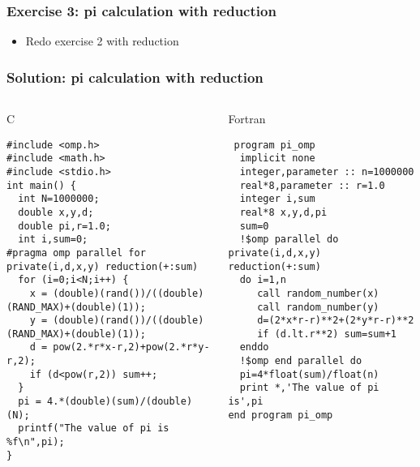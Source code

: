 \documentclass[slidestop,mathserif,compress,xcolor=svgnames]{beamer}
\newenvironment{eblock}[0]
{
\begin{beamerboxesrounded}[upper=uppercol2,lower=lowercol2,shadow=true]}
{\end{beamerboxesrounded}}
\begin{document}
\begin{frame}
  \frametitle{\small Exercise 3: pi calculation with reduction}
  \begin{itemize}
    \item Redo exercise 2 with reduction
  \end{itemize}
\end{frame}

\begin{frame}[fragile]
  \frametitle{\small Solution: pi calculation with reduction}
  {\fontsize{4}{5}
  \begin{columns}
    \column{5cm}
    \begin{eblock}{C }
      \begin{verbatim}
#include <omp.h>
#include <math.h>
#include <stdio.h>
int main() {
  int N=1000000;
  double x,y,d;
  double pi,r=1.0;
  int i,sum=0;
#pragma omp parallel for private(i,d,x,y) reduction(+:sum)
  for (i=0;i<N;i++) {
    x = (double)(rand())/((double)(RAND_MAX)+(double)(1));
    y = (double)(rand())/((double)(RAND_MAX)+(double)(1));
    d = pow(2.*r*x-r,2)+pow(2.*r*y-r,2);
    if (d<pow(r,2)) sum++;
  }
  pi = 4.*(double)(sum)/(double)(N);
  printf("The value of pi is %f\n",pi);
}  
      \end{verbatim}
    \end{eblock}
    \column{5cm}
    \begin{eblock}{Fortran}
      \begin{verbatim}
 program pi_omp
  implicit none
  integer,parameter :: n=1000000
  real*8,parameter :: r=1.0
  integer i,sum
  real*8 x,y,d,pi
  sum=0
  !$omp parallel do private(i,d,x,y) reduction(+:sum)
  do i=1,n
     call random_number(x)
     call random_number(y)
     d=(2*x*r-r)**2+(2*y*r-r)**2
     if (d.lt.r**2) sum=sum+1
  enddo
  !$omp end parallel do
  pi=4*float(sum)/float(n)
  print *,'The value of pi is',pi
end program pi_omp
     \end{verbatim}
    \end{eblock}
  \end{columns}
  }
\end{frame}
\end{document}
